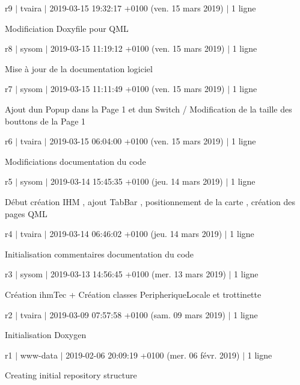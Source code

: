 r9 $\vert$ tvaira $\vert$ 2019-\/03-\/15 19\+:32\+:17 +0100 (ven. 15 mars 2019) $\vert$ 1 ligne

Modificiation Doxyfile pour Q\+ML

r8 $\vert$ sysom $\vert$ 2019-\/03-\/15 11\+:19\+:12 +0100 (ven. 15 mars 2019) $\vert$ 1 ligne

Mise à jour de la documentation logiciel

r7 $\vert$ sysom $\vert$ 2019-\/03-\/15 11\+:11\+:49 +0100 (ven. 15 mars 2019) $\vert$ 1 ligne

Ajout d\textquotesingle{}un Popup dans la Page 1 et d\textquotesingle{}un Switch / Modification de la taille des bouttons de la Page 1

r6 $\vert$ tvaira $\vert$ 2019-\/03-\/15 06\+:04\+:00 +0100 (ven. 15 mars 2019) $\vert$ 1 ligne

Modificiations documentation du code

r5 $\vert$ sysom $\vert$ 2019-\/03-\/14 15\+:45\+:35 +0100 (jeu. 14 mars 2019) $\vert$ 1 ligne

Début création I\+HM , ajout Tab\+Bar , positionnement de la carte , création des pages Q\+ML

r4 $\vert$ tvaira $\vert$ 2019-\/03-\/14 06\+:46\+:02 +0100 (jeu. 14 mars 2019) $\vert$ 1 ligne

Initialisation commentaires documentation du code

r3 $\vert$ sysom $\vert$ 2019-\/03-\/13 14\+:56\+:45 +0100 (mer. 13 mars 2019) $\vert$ 1 ligne

Création ihm\+Tec + Création classes Peripherique\+Locale et trottinette

r2 $\vert$ tvaira $\vert$ 2019-\/03-\/09 07\+:57\+:58 +0100 (sam. 09 mars 2019) $\vert$ 1 ligne

Initialisation Doxygen

r1 $\vert$ www-\/data $\vert$ 2019-\/02-\/06 20\+:09\+:19 +0100 (mer. 06 févr. 2019) $\vert$ 1 ligne

Creating initial repository structure 
